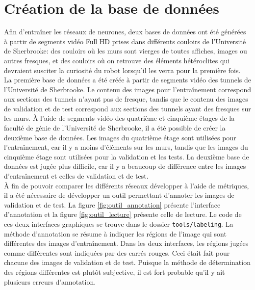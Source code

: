 \section{Création de la base de données}
    Afin d'entraîner les réseaux de neurones, deux bases de données ont été générées à partir de segments vidéo Full HD prises dans différents couloirs de l’Université de Sherbrooke: des couloirs où les murs sont vierges de toutes affiches, images ou autres fresques, et des couloirs où on retrouve des éléments hétéroclites qui devraient susciter la curiosité du robot lorsqu’il les verra pour la première fois.\\
    
    La première base de données a été créée à partir de segments vidéo des tunnels de l'Université de Sherbrooke. Le contenu des images pour l'entraînement correspond aux sections des tunnels n'ayant pas de fresque, tandis que le contenu des images de validation et de test correspond aux sections des tunnels ayant des fresques sur les murs. À l'aide de segments vidéo des quatrième et cinquième étages de la faculté de génie de l'Université de Sherbrooke, il a été possible de créer la deuxième base de données. Les images du quatrième étage sont utilisées pour l'entraînement, car il y a moins d'éléments sur les murs, tandis que les images du cinquième étage sont utilisées pour la validation et les tests. La deuxième base de données est jugée plus difficile, car il y a beaucoup de différence entre les images d'entraînement et celles de validation et de test.\\
    
    À fin de pouvoir comparer les différents réseaux développer à l'aide de métriques, il a été nécessaire de développer un outil permettant d'annoter les images de validation et de test. La figure \ref{fig:outil_annotation} présente l'interface d'annotation et la figure \ref{fig:outil_lecture} présente celle de lecture. Le code de ces deux interfaces graphiques se trouve dans le dossier \texttt{tools/labeling}. La méthode d'annotation se résume à indiquer les régions de l'image qui sont différentes des images d'entraînement. Dans les deux interfaces, les régions jugées comme différentes sont indiquées par des carrés rouges. Ceci était fait pour chacune des images de validation et de test. Puisque la méthode de détermination des régions différentes est plutôt subjective, il est fort probable qu'il y ait plusieurs erreurs d'annotation.
    
